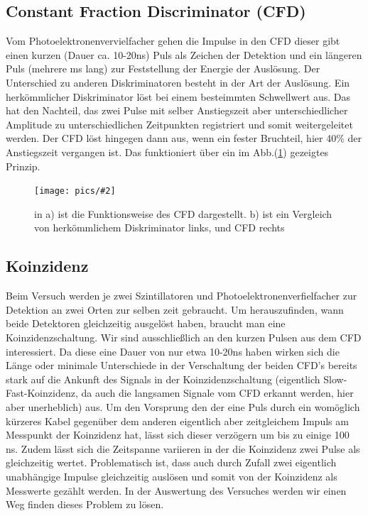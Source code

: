 \documentclass[12pt]{article}
\newcommand{\bild}[3]{\begin{figure}[H] \centering \texttt{[image: pics/\#2]} \caption{#3}	\label{img:#2} \end{figure}}
\begin{document}
\subsection{Constant Fraction Discriminator (CFD)}
Vom Photoelektronenvervielfacher gehen die Impulse in den CFD dieser gibt einen kurzen (Dauer ca. 10-20ns) Puls als Zeichen der Detektion und ein längeren Puls (mehrere ms lang) zur Feststellung der Energie der Auslösung. Der Unterschied zu anderen Diskriminatoren besteht in der Art der Auslösung. Ein herkömmlicher Diskriminator löst bei einem besteimmten Schwellwert aus. Das hat den Nachteil, das zwei Pulse mit selber Anstiegszeit aber unterschiedlicher Amplitude zu unterschiedlichen Zeitpunkten registriert und somit weitergeleitet werden. Der CFD löst hingegen dann aus, wenn ein fester Bruchteil, hier 40\% der Anstiegszeit vergangen ist. Das funktioniert über ein im Abb.(\ref{img:CFD}) gezeigtes Prinzip.
\bild{0.7}{CFD}{in a) ist die Funktionsweise des CFD dargestellt. b) ist ein Vergleich von herkömmlichem Diskriminator links, und CFD rechts}
\subsection{Koinzidenz}
Beim Versuch werden je zwei Szintillatoren und Photoelektronenverfielfacher zur Detektion an zwei Orten zur selben zeit gebraucht. Um herauszufinden, wann beide Detektoren gleichzeitig ausgelöst haben, braucht man eine Koinzidenzschaltung. Wir sind ausschließlich an den kurzen Pulsen aus dem CFD interessiert. Da diese eine Dauer von nur etwa 10-20ns haben wirken sich die Länge oder minimale Unterschiede in der Verschaltung der beiden CFD's bereits stark auf die Ankunft des Signals in der Koinzidenzschaltung (eigentlich Slow-Fast-Koinzidenz, da auch die langsamen Signale vom CFD erkannt werden, hier aber unerheblich) aus. Um den Vorsprung den der eine Puls durch ein womöglich kürzeres Kabel gegenüber dem anderen eigentlich aber zeitgleichem Impuls am Messpunkt der Koinzidenz hat, lässt sich dieser verzögern um bis zu einige 100 ns. Zudem lässt sich die Zeitspanne variieren in der die Koinzidenz zwei Pulse als gleichzeitig wertet. Problematisch ist, dass auch durch Zufall zwei eigentlich unabhängige Impulse gleichzeitig auslösen und somit von der Koinzidenz als Messwerte gezählt werden. In der Auswertung des Versuches werden wir einen Weg finden dieses Problem zu lösen.
\newpage
\nocite{Schatz.2008}
\nocite{Wikipedia.2014}
\printbibliography

\newpage
\begin{appendix}
\section{}

\end{appendix}
\end{document}
